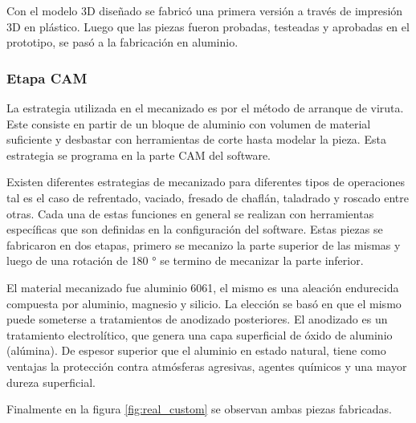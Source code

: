 Con el modelo 3D diseñado se fabricó una primera versión a través de impresión 3D en plástico. Luego que las piezas fueron probadas, testeadas y aprobadas en el prototipo, se pasó a la fabricación en aluminio.

\subsubsection{Etapa CAM}

La estrategia utilizada en el mecanizado es por el método de arranque de viruta. Este consiste en partir de un bloque de aluminio con volumen de material suficiente y desbastar con herramientas de corte hasta modelar la pieza. Esta estrategia se programa en la parte CAM del software. 


Existen diferentes estrategias de mecanizado para diferentes tipos de operaciones tal es el caso de refrentado, vaciado, fresado de chaflán, taladrado y roscado entre otras. Cada una de estas funciones en general se realizan con herramientas específicas que son definidas en la configuración del software.
Estas piezas se fabricaron en dos etapas, primero se mecanizo la parte superior de las mismas y luego de una rotación de  180 ° se termino de mecanizar la parte inferior.

El material mecanizado fue aluminio 6061, el mismo es una aleación endurecida compuesta por aluminio, magnesio y silicio. La elección se basó en que el mismo puede someterse a tratamientos de anodizado posteriores. El anodizado es un tratamiento electrolítico, que genera una capa superficial de óxido de aluminio (alúmina). De espesor superior que el aluminio en estado natural, tiene como ventajas la protección contra atmósferas agresivas, agentes químicos y una mayor dureza superficial.

Finalmente en la figura \ref{fig:real_custom} se observan ambas piezas fabricadas.

